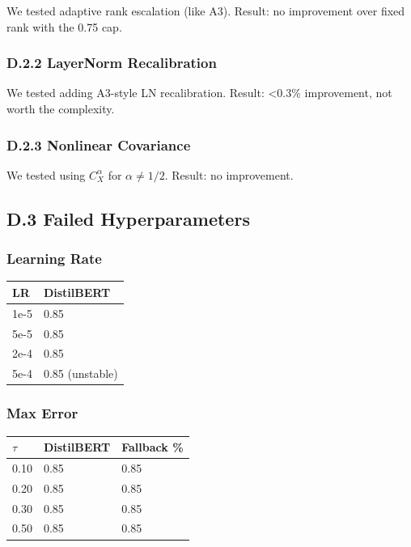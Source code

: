 We tested adaptive rank escalation (like A3). Result: no improvement over 
fixed rank with the 0.75 cap.

\subsubsection{D.2.2 LayerNorm Recalibration}

We tested adding A3-style LN recalibration. Result: \textless{}0.3\% improvement, not 
worth the complexity.

\subsubsection{D.2.3 Nonlinear Covariance}

We tested using $C_X^\alpha$ for $\alpha \neq 1/2$. Result: no improvement.

\subsection{D.3 Failed Hyperparameters}

\subsubsection{Learning Rate}

\begin{table}[H]
\centering
\small
\begin{tabular}{ll}
\toprule
\textbf{LR} & \textbf{DistilBERT} \\
\midrule
1e-5 & 0.85 \\
5e-5 & 0.85 \\
2e-4 & 0.85 \\
5e-4 & 0.85 (unstable) \\
\bottomrule
\end{tabular}
\end{table}

\subsubsection{Max Error}

\begin{table}[H]
\centering
\small
\begin{tabular}{lll}
\toprule
\textbf{$\tau$} & \textbf{DistilBERT} & \textbf{Fallback \%} \\
\midrule
0.10 & 0.85 & 0.85 \\
0.20 & 0.85 & 0.85 \\
0.30 & 0.85 & 0.85 \\
0.50 & 0.85 & 0.85 \\
\bottomrule
\end{tabular}
\end{table}

